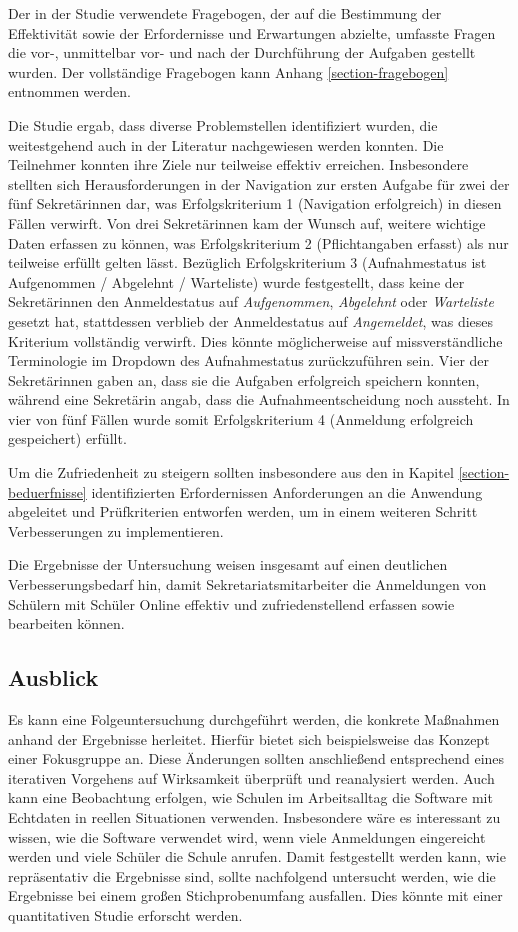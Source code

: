 Der in der Studie verwendete Fragebogen, der auf die Bestimmung der Effektivität sowie der Erfordernisse und Erwartungen abzielte, umfasste Fragen die vor-, unmittelbar vor- und nach der Durchführung der Aufgaben gestellt wurden. Der vollständige Fragebogen kann Anhang \ref{section-fragebogen} entnommen werden.

Die Studie ergab, dass diverse Problemstellen identifiziert wurden, die weitestgehend auch in der Literatur nachgewiesen werden konnten. Die Teilnehmer konnten ihre Ziele nur teilweise effektiv erreichen. Insbesondere stellten sich Herausforderungen in der Navigation zur ersten Aufgabe für zwei der fünf Sekretärinnen dar, was Erfolgskriterium 1 (Navigation erfolgreich) in diesen Fällen verwirft. Von drei Sekretärinnen kam der Wunsch auf, weitere wichtige Daten erfassen zu können, was Erfolgskriterium 2 (Pflichtangaben erfasst) als nur teilweise erfüllt gelten lässt. Bezüglich Erfolgskriterium 3 (Aufnahmestatus ist Aufgenommen / Abgelehnt / Warteliste) wurde festgestellt, dass keine der Sekretärinnen den Anmeldestatus auf \textit{Aufgenommen}, \textit{Abgelehnt} oder \textit{Warteliste} gesetzt hat, stattdessen verblieb der Anmeldestatus auf \textit{Angemeldet}, was dieses Kriterium vollständig verwirft. Dies könnte möglicherweise auf missverständliche Terminologie im Dropdown des Aufnahmestatus zurückzuführen sein. 
Vier der Sekretärinnen gaben an, dass sie die Aufgaben erfolgreich speichern konnten, während eine Sekretärin angab, dass die Aufnahmeentscheidung noch aussteht. In vier von fünf Fällen wurde somit Erfolgskriterium 4 (Anmeldung erfolgreich gespeichert) erfüllt.

Um die Zufriedenheit zu steigern sollten insbesondere aus den in Kapitel \ref{section-beduerfnisse} identifizierten Erfordernissen Anforderungen an die Anwendung abgeleitet und Prüfkriterien entworfen werden, um in einem weiteren Schritt Verbesserungen zu implementieren.   

Die Ergebnisse der Untersuchung weisen insgesamt auf einen deutlichen Verbesserungsbedarf hin, damit Sekretariatsmitarbeiter die Anmeldungen von Schülern mit Schüler Online effektiv und zufriedenstellend erfassen sowie bearbeiten können.

\subsection{Ausblick}
Es kann eine Folgeuntersuchung durchgeführt werden, die konkrete Maßnahmen anhand der Ergebnisse herleitet. Hierfür bietet sich beispielsweise das Konzept einer Fokusgruppe an. Diese Änderungen sollten anschließend entsprechend eines iterativen Vorgehens auf Wirksamkeit überprüft und reanalysiert werden. 
Auch kann eine Beobachtung erfolgen, wie Schulen im Arbeitsalltag die Software mit Echtdaten in reellen Situationen verwenden. Insbesondere wäre es interessant zu wissen, wie die Software verwendet wird, wenn viele Anmeldungen eingereicht werden und viele Schüler die Schule anrufen.
Damit festgestellt werden kann, wie repräsentativ die Ergebnisse sind, sollte nachfolgend untersucht werden, wie die Ergebnisse bei einem großen Stichprobenumfang ausfallen. Dies könnte mit einer quantitativen Studie erforscht werden.
